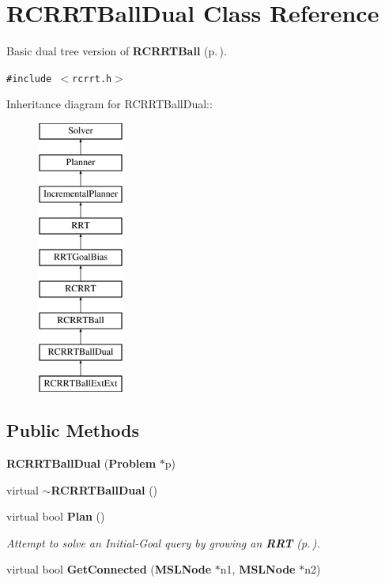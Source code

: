 \section{RCRRTBall\-Dual  Class Reference}
\label{classRCRRTBallDual}
Basic dual tree version of {\bf RCRRTBall} {\rm (p.\,\pageref{classRCRRTBall})}. 


{\tt \#include $<$rcrrt.h$>$}

Inheritance diagram for RCRRTBall\-Dual::\begin{figure}[H]
\begin{center}
\leavevmode
\includegraphics[height=9cm]{classRCRRTBallDual}
\end{center}
\end{figure}
\subsection*{Public Methods}
\begin{CompactItemize}
\item 
{\bf RCRRTBall\-Dual} ({\bf Problem} $\ast$p)
\item 
virtual {\bf $\sim$RCRRTBall\-Dual} ()
\item 
virtual bool {\bf Plan} ()
\begin{CompactList}\small\item\em Attempt to solve an Initial-Goal query by growing an {\bf RRT} {\rm (p.\,\pageref{classRRT})}.\item\end{CompactList}\item 
virtual bool {\bf Get\-Connected} ({\bf MSLNode} $\ast$n1, {\bf MSLNode} $\ast$n2)
\end{CompactItemize}
